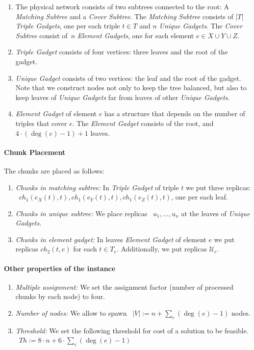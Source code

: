 \documentclass[preprint,12pt]{elsarticle}
\newcommand{\numNodes}{\ensuremath{|V|}}
\newcommand{\MatchSubtree}{{\emph{Matching Subtree}}}
\newcommand{\CoverSubtree}{{\emph{Cover Subtree}}}
\newcommand{\TripleGadget}{{\emph{Triple Gadget}}}
\newcommand{\TripleGadgets}{{\emph{Triple Gadgets}}}
\newcommand{\UnqGadget}{{\emph{Unique Gadget}}}
\newcommand{\UnqGadgets}{{\emph{Unique Gadgets}}}
\newcommand{\ElGadget}{{\emph{Element Gadget}}}
\newcommand{\ElGadgets}{{\emph{Element Gadgets}}}
\newcommand{\UniqueE}{{\ensuremath{\mathcal{U}_e}}}
\newcommand{\Thr}{\ensuremath{Th}}
\begin{document}
\begin{enumerate}
  \item The physical network consists of two subtrees connected to the
  root: A {\MatchSubtree} and a {\CoverSubtree}. The
  {\MatchSubtree} consists of $|T|$ {\TripleGadgets}, one per each triple $t\in T$ and $n$
  {\UnqGadgets}. The {\CoverSubtree} consist of~$n$ {\ElGadgets}, one for each element $e\in X\cup Y\cup Z$.
  \item {\TripleGadget} consists of four vertices: three leaves and the root of the gadget.
  \item {\UnqGadget} consists of two vertices: the leaf and the root of the gadget. Note that we construct
  nodes not only to keep the tree balanced, but also to keep leaves of
  {\UnqGadgets} far from leaves of other \UnqGadgets.
  \item {\ElGadget} of element $e$ has a structure that depends on the number of triples that cover $e$. The {\ElGadget} consists of the
  root, and~$4\cdot(\deg(e)-1)+1$ leaves.
\end{enumerate}

\paragraph{Chunk Placement}
The chunks are placed as follows:
\begin{enumerate}
  \item \emph{Chunks in matching subtree:} In {\TripleGadget} of triple $t$ we put
  three replicas:
 ~$ch_1(e_X(t), t), ch_1(e_Y(t), t), ch_1(e_Z(t), t)$, one per each leaf.
  \item \emph{Chunks in unique subtree:} We place replicas
 ~$u_1,\ldots, u_n$ at the leaves of \UnqGadgets.
 \item \emph{Chunks in element gadget:} In leaves {\ElGadget} of element $e$ we put replicas $ch_2(t, e)$ for each $t \in T_e$. Additionally, we put replicas $\UniqueE$.
\end{enumerate}

\paragraph{Other properties of the instance}
\begin{enumerate}
  \item \emph{Multiple assignment:} We set the assignment factor (number of processed
  chunks by each node) to four.
  \item \emph{Number of nodes:} We allow to spawn
 ~$\numNodes := n + \sum_{e}(\deg(e)-1)$ nodes.
  \item \emph{Threshold:} We set the following threshold for cost of a solution to be feasible.
 ~$\Thr := 8\cdot n + 6\cdot\sum_{e}(\deg(e)-1)$
\end{enumerate}
\end{document}
